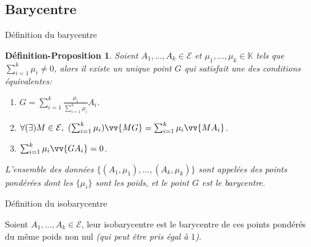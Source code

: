 \documentclass[aspectratio=1610 %
]{beamer}
\newtheorem{defprop}[theorem]{Définition-Proposition}
\let\ens\mathcal
\begin{document}
\subsection{Barycentre}
  \begin{frame}{Définition du barycentre}
    \begin{defprop}
      Soient $A_{1},\ldots,A_{k} \in \ens{E}$ et $\mu_{1},\ldots,\mu_{k} \in \mathbb{K}$ tels que $\sum_{i=1}^{k}\mu_{i} \neq 0$, alors il existe un unique point $G$ qui satisfait une des conditions équivalentes:
        \begin{enumerate}[<+(1)->]
          \item $G = \sum_{i=1}^{k}\frac{\mu_{i}}{\sum_{i=1}^{k}\mu_{i}}A_{i}$.
          \item $\forall(\exists)M\in \ens{E},\ (\sum_{i=1}^{k}\mu_{i})\vv{MG}=\sum_{i=1}^{k}\mu_{i}\vv{MA_{i}}$.
          \item $\sum_{i=1}^{k}\mu_{i}\vv{GA_{i}} = 0$.
        \end{enumerate}
      L'ensemble des données $\{(A_{1},\mu_{1}),\ldots,(A_{k},\mu_{k})\}$ sont appelées \alert{des points pondérées} dont les $\{\mu_{i}\}$ sont les \alert{poids}, et le point $G$ est \alert{le barycentre}.
    \end{defprop}
  \end{frame}
  \begin{frame}{Définition du isobarycentre}
    \begin{definition}
      Soient $A_{1},\ldots,A_{k} \in \ens{E}$, leur \alert{isobarycentre} est le barycentre de ces points pondérés du même poids non nul \emph{(qui peut être pris égal à $1$)}.
    \end{definition}
  \end{frame}
\end{document}
